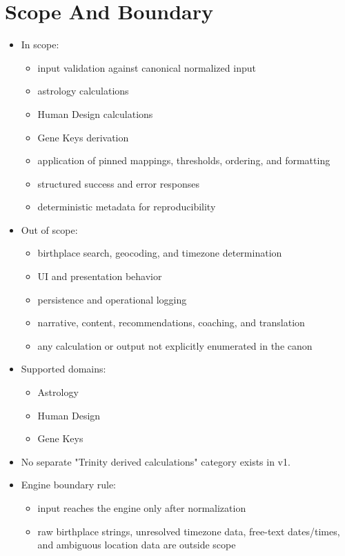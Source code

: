 \documentclass[11pt]{article}
\begin{document}
\section{Scope And Boundary}
\label{sec:org134b9ea}
\begin{itemize}
\item In scope:
\begin{itemize}
\item input validation against canonical normalized input
\item astrology calculations
\item Human Design calculations
\item Gene Keys derivation
\item application of pinned mappings, thresholds, ordering, and formatting
\item structured success and error responses
\item deterministic metadata for reproducibility
\end{itemize}
\item Out of scope:
\begin{itemize}
\item birthplace search, geocoding, and timezone determination
\item UI and presentation behavior
\item persistence and operational logging
\item narrative, content, recommendations, coaching, and translation
\item any calculation or output not explicitly enumerated in the canon
\end{itemize}
\item Supported domains:
\begin{itemize}
\item Astrology
\item Human Design
\item Gene Keys
\end{itemize}
\item No separate "Trinity derived calculations" category exists in v1.
\item Engine boundary rule:
\begin{itemize}
\item input reaches the engine only after normalization
\item raw birthplace strings, unresolved timezone data, free-text dates/times, and ambiguous location data are outside scope
\end{itemize}
\end{itemize}
\end{document}
